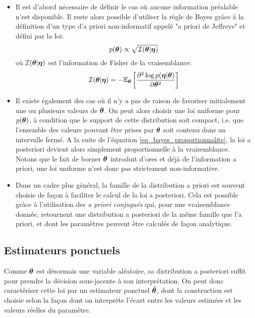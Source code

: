 	\begin{itemize}
		\item Il est d'abord nécessaire de définir le cas où aucune information préalable n'est disponible. Il reste alors possible d'utiliser la règle de Bayes grâce à la définition d'un type d'a priori non-informatif appelé "a priori de Jeffreys" et défini par la loi:\\
		\begin{equation}
		p({\bm{\theta}}) \propto \sqrt{\mathcal{I}({\bm{\theta}} | {\bm{\eta}})}
		\label{eq_jeffreys}
		\end{equation}
		où $\mathcal{I}({\bm{\theta}} | {\bm{\eta}})$ est l'information de Fisher de la vraisemblance:
		\begin{equation}
		\mathcal{I}({\bm{\theta}} | {\bm{\eta}}) = -\mathbb{E}_{\bm{\theta}}\left[\dfrac{\partial^2 \log p({\bm{\eta}}|{\bm{\theta}})}{\partial {\bm{\theta}}^2}\right]
		\end{equation}
		
		\item Il existe également des cas où il n'y a pas de raison de favoriser initialement une ou plusieurs valeurs de ${\bm{\theta}}$. On peut alors choisir une loi uniforme pour $p({\bm{\theta}})$, à condition que le support de cette distribution soit compact, i.e. que l'ensemble des valeurs pouvant être prises par ${\bm{\theta}}$ soit contenu dans un intervalle fermé. A la suite de l'équation \eqref{eq_bayes_proportionnalite}, la loi a posteriori devient alors simplement proportionnelle à la vraisemblance. Notons que le fait de borner ${\bm{\theta}}$ introduit d'ores et déjà de l'information a priori, une loi uniforme n'est donc pas strictement non-informative.\\
		
		\item Dans un cadre plus général, la famille de la distribution a priori est souvent choisie de façon à faciliter le calcul de la loi a posteriori. Cela est possible grâce à l'utilisation des \textit{a priori conjugués} qui, pour une vraisemblance donnée, retournent une distribution a posteriori de la même famille que l'a priori, et dont les paramètres peuvent être calculés de façon analytique.\\
	\end{itemize}
	
	\subsection{Estimateurs ponctuels}
Comme ${\bm{\theta}}$ est désormais une variable aléatoire, sa distribution a posteriori suffit pour prendre la décision sous-jacente à son interprétation. On peut donc caractériser cette loi par un estimateur ponctuel $\hat{{\bm{\theta}}}$, dont la construction est choisie selon la façon dont on interprète l'écart entre les valeurs estimées et les valeurs réelles du paramètre.\\

